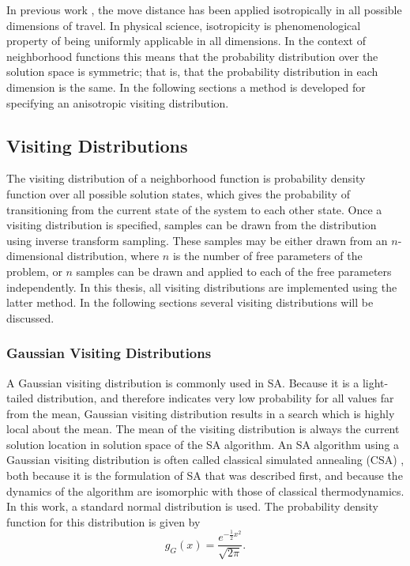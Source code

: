 \documentclass[11pt]{afthesis}
\begin{document}
	In previous work \cite{tsallis1996generalizedsimulatedannealing}, the move distance has been applied isotropically in all possible dimensions of travel. In physical science, isotropicity is phenomenological property of being uniformly applicable in all dimensions. In the context of neighborhood functions this means that the probability distribution over the solution space is symmetric; that is, that the probability distribution in each dimension is the same. In the following sections a method is developed for specifying an anisotropic visiting distribution.
	
	
	\subsection{Visiting Distributions}

	
	The visiting distribution of a neighborhood function is probability density function over all possible solution states, which gives the probability of transitioning from the current state of the system to each other state. Once a visiting distribution is specified, samples can be drawn from the distribution using inverse transform sampling. These samples may be either drawn from an $n$-dimensional distribution, where $n$ is the number of free parameters of the problem, or $n$ samples can be drawn and applied to each of the free parameters independently. In this thesis, all visiting distributions are implemented using the latter method. In the following sections several visiting distributions will be discussed.
	
	\label{scn:visiting_distributions}
	
	\subsubsection{Gaussian Visiting Distributions}
	\label{scn:classical_visiting}
	
	A Gaussian visiting distribution is commonly used in SA. Because it is a light-tailed distribution, and therefore indicates very low probability for all values far from the mean, Gaussian visiting distribution results in a search which is highly local about the mean. The mean of the visiting distribution is always the current solution location in solution space of the SA algorithm. An SA algorithm using a Gaussian visiting distribution is often called classical simulated annealing (CSA) \cite{tsallis1996generalizedsimulatedannealing}, both because it is the formulation of SA that was described first, and because the dynamics of the algorithm are isomorphic with those of classical thermodynamics. In this work, a standard normal distribution is used. The probability density function for this distribution is given by 
	\begin{equation}
	g_G(x) = \frac{e^{-\frac{1}{2} x^2}}{\sqrt{2\pi}}.
	\label{eq:normal_pdf}
	\end{equation}
	
\end{document}
